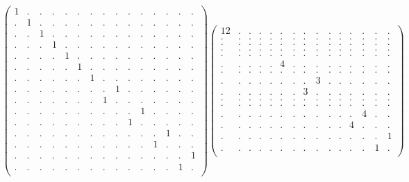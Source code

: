 \documentclass[12pt,a4paper]{amsart}
\begin{document}
\begin{align*}
\left(\begin{array}{rrrrrrrrrrrrrrr}%
1&.&.&.&.&.&.&.&.&.&.&.&.&.&.\\%
.&1&.&.&.&.&.&.&.&.&.&.&.&.&.\\%
.&.&1&.&.&.&.&.&.&.&.&.&.&.&.\\%
.&.&.&1&.&.&.&.&.&.&.&.&.&.&.\\%
.&.&.&.&1&.&.&.&.&.&.&.&.&.&.\\%
.&.&.&.&.&1&.&.&.&.&.&.&.&.&.\\%
.&.&.&.&.&.&1&.&.&.&.&.&.&.&.\\%
.&.&.&.&.&.&.&.&1&.&.&.&.&.&.\\%
.&.&.&.&.&.&.&1&.&.&.&.&.&.&.\\%
.&.&.&.&.&.&.&.&.&.&1&.&.&.&.\\%
.&.&.&.&.&.&.&.&.&1&.&.&.&.&.\\%
.&.&.&.&.&.&.&.&.&.&.&.&1&.&.\\%
.&.&.&.&.&.&.&.&.&.&.&1&.&.&.\\%
.&.&.&.&.&.&.&.&.&.&.&.&.&.&1\\%
.&.&.&.&.&.&.&.&.&.&.&.&.&1&.\\%
\end{array}\right)%
\left(\begin{array}{rrrrrrrrrrrrrrr}%
12&.&.&.&.&.&.&.&.&.&.&.&.&.&.\\%
.&.&.&.&.&.&.&.&.&.&.&.&.&.&.\\%
.&.&.&.&.&.&.&.&.&.&.&.&.&.&.\\%
.&.&.&.&.&.&.&.&.&.&.&.&.&.&.\\%
.&.&.&.&.&.&.&.&.&.&.&.&.&.&.\\%
.&.&.&.&.&4&.&.&.&.&.&.&.&.&.\\%
.&.&.&.&.&.&.&.&.&.&.&.&.&.&.\\%
.&.&.&.&.&.&.&.&3&.&.&.&.&.&.\\%
.&.&.&.&.&.&.&3&.&.&.&.&.&.&.\\%
.&.&.&.&.&.&.&.&.&.&.&.&.&.&.\\%
.&.&.&.&.&.&.&.&.&.&.&.&.&.&.\\%
.&.&.&.&.&.&.&.&.&.&.&.&4&.&.\\%
.&.&.&.&.&.&.&.&.&.&.&4&.&.&.\\%
.&.&.&.&.&.&.&.&.&.&.&.&.&.&1\\%
.&.&.&.&.&.&.&.&.&.&.&.&.&1&.\\%
\end{array}\right)%
\end{align*}
\end{document}
